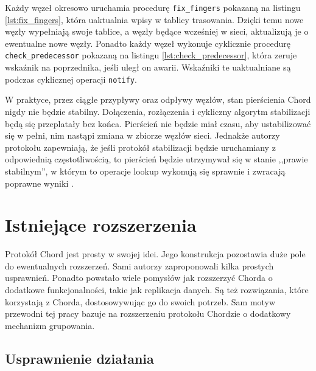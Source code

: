 \documentclass[12pt, twoside, openany]{report}
\begin{document}


Każdy węzeł okresowo uruchamia procedurę \texttt{fix\_fingers} pokazaną na listingu \ref{lst:fix_fingers}, która uaktualnia wpisy w tablicy trasowania. Dzięki temu nowe węzły wypełniają swoje tablice, a węzły będące wcześniej w sieci, aktualizują je o ewentualne nowe węzły. Ponadto każdy węzeł wykonuje cyklicznie procedurę \\\texttt{check\_predecessor} pokazaną na listingu \ref{lst:check_predecessor}, która zeruje wskaźnik na poprzednika, jeśli uległ on awarii. Wskaźniki te uaktualniane są podczas cyklicznej operacji \texttt{notify}.

W praktyce, przez ciągłe przypływy oraz odpływy węzłów, stan pierścienia Chord nigdy nie będzie stabilny. Dołączenia, rozłączenia i cykliczny algorytm stabilizacji będą się przeplatały bez końca. Pierścień nie będzie miał czasu, aby ustabilizować się w pełni, nim nastąpi zmiana w zbiorze węzłów sieci. Jednakże autorzy protokołu zapewniają, że jeśli protokół stabilizacji będzie uruchamiany z odpowiednią częstotliwością, to pierścień będzie utrzymywał się w stanie ,,prawie stabilnym'', w którym to operacje lookup wykonują się sprawnie i zwracają poprawne wyniki \cite{bib:chord}.

\section{Istniejące rozszerzenia}

Protokół Chord jest prosty w swojej idei. Jego konstrukcja pozostawia duże pole do ewentualnych rozszerzeń. Sami autorzy zaproponowali kilka prostych usprawnień. Ponadto powstało wiele pomysłów jak rozszerzyć Chorda o dodatkowe funkcjonalności, takie jak replikacja danych. Są też rozwiązania, które korzystają z Chorda, dostosowywując go do swoich potrzeb. Sam motyw przewodni tej pracy bazuje na rozszerzeniu protokołu Chordzie o dodatkowy mechanizm grupowania.

\subsection{Usprawnienie działania}
\end{document}
